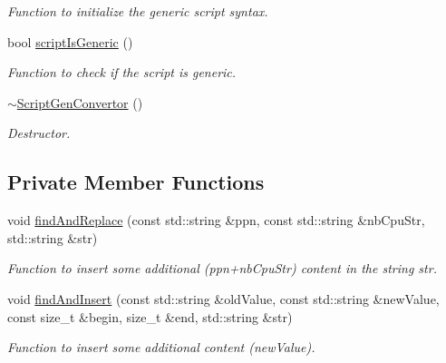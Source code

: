 \begin{DoxyCompactItemize}
\begin{DoxyCompactList}\small\item\em Function to initialize the generic script syntax. \item\end{DoxyCompactList}\item 
\hypertarget{classScriptGenConvertor_a68a898be8895636a6eefe554fba85dcb}{
bool \hyperlink{classScriptGenConvertor_a68a898be8895636a6eefe554fba85dcb}{scriptIsGeneric} ()}
\label{classScriptGenConvertor_a68a898be8895636a6eefe554fba85dcb}

\begin{DoxyCompactList}\small\item\em Function to check if the script is generic. \item\end{DoxyCompactList}\item 
\hypertarget{classScriptGenConvertor_a4442698edc5d4a92edb852814d380d06}{
\hyperlink{classScriptGenConvertor_a4442698edc5d4a92edb852814d380d06}{$\sim$ScriptGenConvertor} ()}
\label{classScriptGenConvertor_a4442698edc5d4a92edb852814d380d06}

\begin{DoxyCompactList}\small\item\em Destructor. \item\end{DoxyCompactList}\end{DoxyCompactItemize}
\subsection*{Private Member Functions}
\begin{DoxyCompactItemize}
\item 
void \hyperlink{classScriptGenConvertor_a5f8116622cdd76d1dbe8b43ea48d4baa}{findAndReplace} (const std::string \&ppn, const std::string \&nbCpuStr, std::string \&str)
\begin{DoxyCompactList}\small\item\em Function to insert some additional (ppn+nbCpuStr) content in the string str. \item\end{DoxyCompactList}\item 
void \hyperlink{classScriptGenConvertor_a904bac9af9a7542c35cb085979d1eda2}{findAndInsert} (const std::string \&oldValue, const std::string \&newValue, const size\_\-t \&begin, size\_\-t \&end, std::string \&str)
\begin{DoxyCompactList}\small\item\em Function to insert some additional content (newValue). \item\end{DoxyCompactList}\end{DoxyCompactItemize}
